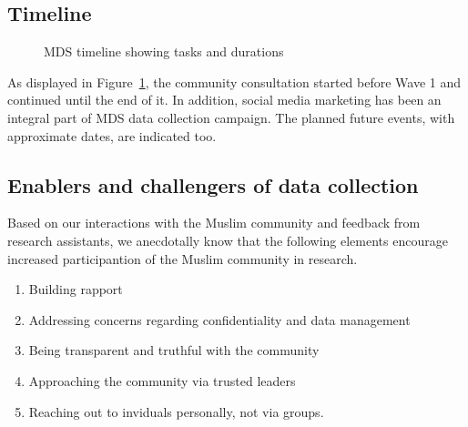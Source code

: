 \documentclass[
]{interact}
\providecommand{\tightlist}{%
  \setlength{\itemsep}{0pt}\setlength{\parskip}{0pt}}\usepackage{longtable,booktabs,array}
\begin{document}
\subsection{Timeline}\label{timeline}

\begin{figure}


\caption{\label{fig-timeline}MDS timeline showing tasks and durations}

\end{figure}%

As displayed in Figure~\ref{fig-timeline}, the community consultation
started before Wave 1 and continued until the end of it. In addition,
social media marketing has been an integral part of MDS data collection
campaign. The planned future events, with approximate dates, are
indicated too.

\subsection{Enablers and challengers of data
collection}\label{enablers-and-challengers-of-data-collection}

Based on our interactions with the Muslim community and feedback from
research assistants, we anecdotally know that the following elements
encourage increased participantion of the Muslim community in research.

\begin{enumerate}
\def\labelenumi{\arabic{enumi}.}
\tightlist
\item
  Building rapport
\item
  Addressing concerns regarding confidentiality and data management
\item
  Being transparent and truthful with the community
\item
  Approaching the community via trusted leaders
\item
  Reaching out to inviduals personally, not via groups.
\end{enumerate}
\end{document}
